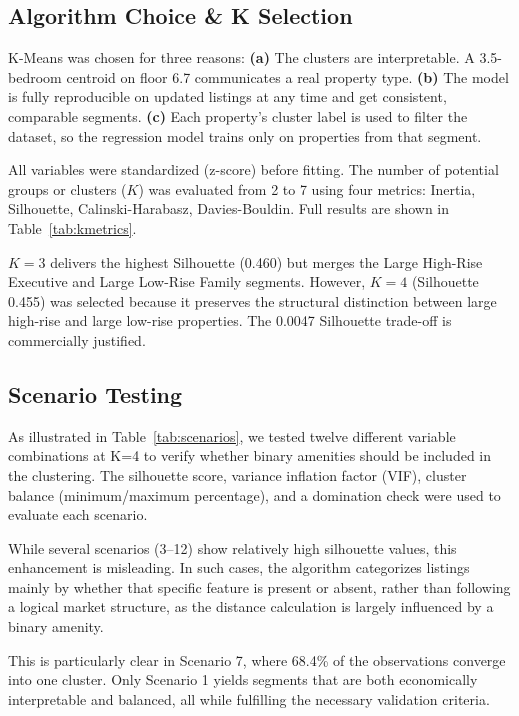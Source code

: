 \documentclass[10pt,a4paper,twocolumn]{article}
\begin{document}
\subsection{Algorithm Choice \& K Selection}

K-Means was chosen for three reasons: \textbf{(a)} The clusters are interpretable. A 3.5-bedroom centroid on floor 6.7 communicates a real property type. \textbf{(b)} The model is fully reproducible on updated listings at any time and get consistent, comparable segments. \textbf{(c)} Each property's cluster label is used to filter the dataset, so the regression model trains only on properties from that segment.

All variables were standardized (z-score) before fitting. The number of potential groups or clusters ($K$) was evaluated from 2 to 7 using four metrics: Inertia, Silhouette, Calinski-Harabasz, Davies-Bouldin. Full results are shown in Table~\ref{tab:kmetrics}.

$K\!=\!3$ delivers the highest Silhouette (0.460) but merges the Large High-Rise Executive and Large Low-Rise Family segments. However, $K\!=\!4$ (Silhouette 0.455) was selected because it preserves the structural distinction between large high-rise and large low-rise properties. The 0.0047 Silhouette trade-off is commercially justified. 

\subsection{Scenario Testing}

As illustrated in Table~\ref{tab:scenarios}, we tested twelve different variable combinations at K=4 to verify whether binary amenities should be included in the clustering. The silhouette score, variance inflation factor (VIF), cluster balance (minimum/maximum percentage), and a domination check were used to evaluate each scenario.

While several scenarios (3--12) show relatively high silhouette values, this enhancement is misleading. In such cases, the algorithm categorizes listings mainly by whether that specific feature is present or absent, rather than following a logical market structure, as the distance calculation is largely influenced by a binary amenity. 

This is particularly clear in Scenario 7, where 68.4\% of the observations converge into one cluster. Only Scenario 1 yields segments that are both economically interpretable and balanced, all while fulfilling the necessary validation criteria.
\end{document}
